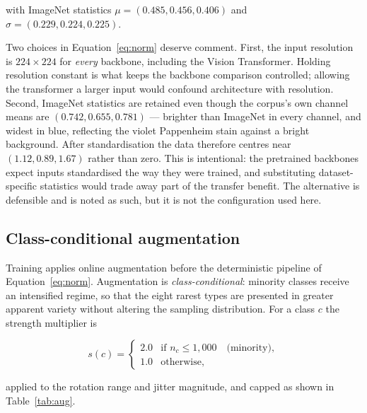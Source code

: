 \documentclass[11pt,a4paper]{article}
\begin{document}
with ImageNet statistics $\mu = (0.485, 0.456, 0.406)$ and
$\sigma = (0.229, 0.224, 0.225)$.

Two choices in Equation~\eqref{eq:norm} deserve comment. First, the input
resolution is $224 \times 224$ for \emph{every} backbone, including the Vision
Transformer. Holding resolution constant is what keeps the backbone comparison
controlled; allowing the transformer a larger input would confound architecture
with resolution. Second, ImageNet statistics are retained even though the
corpus's own channel means are $(0.742, 0.655, 0.781)$ --- brighter than
ImageNet in every channel, and widest in blue, reflecting the violet Pappenheim
stain against a bright background. After standardisation the data therefore
centres near $(1.12, 0.89, 1.67)$ rather than zero. This is intentional: the
pretrained backbones expect inputs standardised the way they were trained, and
substituting dataset-specific statistics would trade away part of the transfer
benefit. The alternative is defensible and is noted as such, but it is not the
configuration used here.

\subsection{Class-conditional augmentation}

Training applies online augmentation before the deterministic pipeline of
Equation~\eqref{eq:norm}. Augmentation is \emph{class-conditional}: minority
classes receive an intensified regime, so that the eight rarest types are
presented in greater apparent variety without altering the sampling
distribution. For a class $c$ the strength multiplier is

\begin{equation}
  s(c) = \begin{cases}
    2.0 & \text{if } n_c \le 1{,}000 \quad \text{(minority)},\\
    1.0 & \text{otherwise},
  \end{cases}
  \label{eq:augscale}
\end{equation}

applied to the rotation range and jitter magnitude, and capped as shown in
Table~\ref{tab:aug}.
\end{document}
